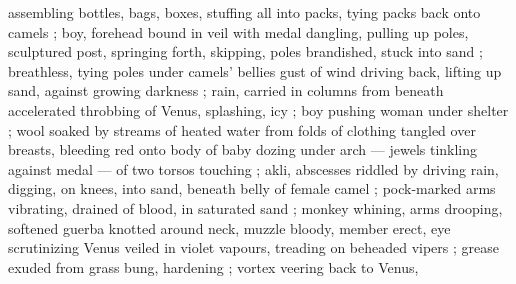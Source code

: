 assembling bottles, bags, boxes, stuffing all into packs, tying packs 
back onto camels ; boy, forehead bound in veil with medal dangling, 
pulling up poles, sculptured post, springing forth, skipping, poles 
brandished, stuck into sand ; breathless, tying poles under camels' 
bellies {\col} gust of wind driving back, lifting up sand, against growing 
darkness ; rain, carried in columns from beneath accelerated 
throbbing of Venus, splashing, icy ; boy pushing woman under 
shelter ; wool soaked by streams of heated water from folds of 
clothing tangled over breasts, bleeding red onto body of baby 
dozing under arch --- jewels tinkling against medal --- of two torsos 
touching ; akli, abscesses riddled by driving rain, digging, on knees, 
into sand, beneath belly of female camel ; pock-marked arms 
vibrating, drained of blood, in saturated sand ; monkey whining, 
arms drooping, softened guerba knotted around neck, muzzle bloody, member erect, eye scrutinizing Venus veiled in violet vapours, treading on beheaded vipers ; grease exuded from grass bung, hardening ; vortex veering back to Venus, 

